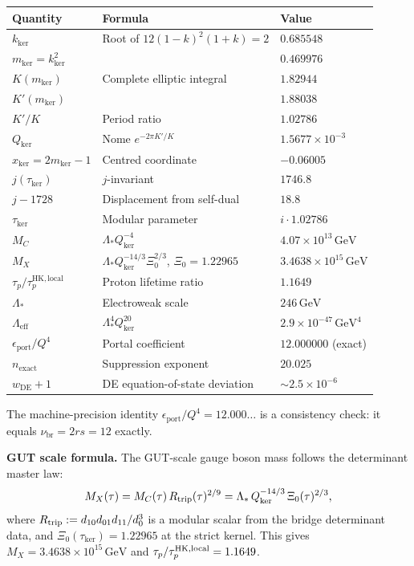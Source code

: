 \documentclass[12pt]{article}
\theoremstyle{plain}
\theoremstyle{definition}
\numberwithin{equation}{section}
\newcommand{\br}{\mathrm{br}}
\newcommand{\kker}{\mathrm{ker}}
\begin{document}
\begin{center}
\begin{tabular}{lll}
\toprule
Quantity & Formula & Value\\
\midrule
$k_{\kker}$ & Root of $12(1-k)^2(1+k)=2$ & $0.685548$\\
$m_{\kker}=k_{\kker}^2$ & & $0.469976$\\
$K(m_{\kker})$ & Complete elliptic integral & $1.82944$\\
$K'(m_{\kker})$ & & $1.88038$\\
$K'/K$ & Period ratio & $1.02786$\\
$Q_{\kker}$ & Nome $e^{-2\pi K'/K}$ & $1.5677\times 10^{-3}$\\
$x_{\kker}=2m_{\kker}-1$ & Centred coordinate & $-0.06005$\\
$j(\tau_{\kker})$ & $j$-invariant & $1746.8$\\
$j-1728$ & Displacement from self-dual & $18.8$\\
$\tau_{\kker}$ & Modular parameter & $i\cdot 1.02786$\\
\midrule
$M_C$ & $\Lambda_* Q_{\kker}^{-4}$ & $4.07\times 10^{13}\,\mathrm{GeV}$\\
$M_X$ & $\Lambda_*Q_{\kker}^{-14/3}\Xi_0^{2/3}$, $\Xi_0=1.22965$ & $3.4638\times 10^{15}\,\mathrm{GeV}$\\
$\tau_p/\tau_p^{\mathrm{HK,local}}$ & Proton lifetime ratio & $1.1649$\\
$\Lambda_*$ & Electroweak scale & $246\,\mathrm{GeV}$\\
$\Lambda_{\mathrm{eff}}$ & $\Lambda_*^4 Q_{\kker}^{20}$ & $2.9\times 10^{-47}\,\mathrm{GeV}^4$\\
$\epsilon_{\mathrm{port}}/Q^4$ & Portal coefficient & $12.000000$ (exact)\\
$n_{\mathrm{exact}}$ & Suppression exponent & $20.025$\\
$w_{\mathrm{DE}}+1$ & DE equation-of-state deviation & $\sim 2.5\times 10^{-6}$\\
\bottomrule
\end{tabular}
\end{center}

The machine-precision identity $\epsilon_{\mathrm{port}}/Q^4=12.000\ldots$ is a consistency check: it equals $\nu_{\br}=2rs=12$ exactly.

\medskip

\noindent\textbf{GUT scale formula.}  The GUT-scale gauge boson mass follows the determinant master law:
\begin{equation}
M_X(\tau) = M_C(\tau)\,R_{\rm trip}(\tau)^{2/9}
= \Lambda_*\,Q_{\kker}^{-14/3}\,\Xi_0(\tau)^{2/3},
\end{equation}
where $R_{\rm trip}:=d_{10}d_{01}d_{11}/d_0^3$ is a modular scalar from the bridge determinant data, and $\Xi_0(\tau_{\kker})=1.22965$ at the strict kernel.  This gives $M_X=3.4638\times10^{15}\,\mathrm{GeV}$ and $\tau_p/\tau_p^{\rm HK,local}=1.1649$.
\end{document}
